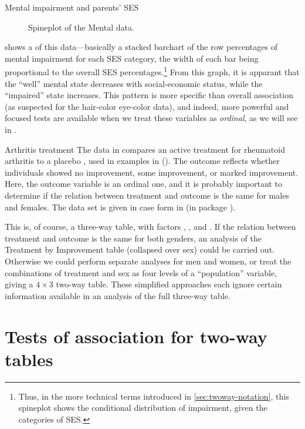 \documentclass[10pt,krantz2]{krantz}\usepackage[]{graphicx}\usepackage[]{color}
\newenvironment{knitrout}{}{} %
\renewenvironment{knitrout}{\small\renewcommand{\baselinestretch}{.85}}{} %
\begin{document}
\begin{Example}[mental1]{Mental impairment and parents' SES}
\begin{knitrout}
\begin{figure}[!htbp]
\caption[Spineplot of the Mental data]{Spineplot of the Mental data.\label{fig:spineplot}}
\end{figure}


\end{knitrout}
 shows a  of this
data---basically a stacked barchart of the row percentages of mental
impairment for each SES category, the width of each bar being proportional to
the overall SES percentages.\footnote{Thus, in the more technical terms introduced in \ref{sec:twoway-notation}, 
this spineplot shows the conditional distribution of impairment, given
the categories of SES.}
From this graph, it is apparant that the ``well'' mental state decreases with
social-economic status, while the ``impaired'' state increases. This
pattern is more specific than overall association (as
suspected for the hair-color eye-color data), and indeed, more powerful and focused tests are available
when we treat these variables as \emph{ordinal}, as we will see in
.
\end{Example}

\begin{Example}[arthrit1]{Arthritis treatment}
The data in  compares an active treatment for rheumatoid
arthritis to a placebo
\citep{KochEdwards:88}, used in examples in 
().
The outcome reflects
whether individuals showed no improvement, some improvement, or
marked improvement.
Here, the outcome variable is an ordinal one, and it is probably
important to determine if the relation between treatment and outcome
is the same for males and females.
The data set is given in case form in  (in package ).


This is, of course, a three-way table, with factors
, , and .
If the relation between treatment and outcome is the same for
both genders, an analysis of the Treatment by Improvement
table (collapsed over sex) could be carried out.
Otherwise we could perform separate analyses for
men and women, or
treat the combinations of treatment and sex as four levels of
a ``population'' variable, giving a $4 \times 3$ two-way table.
These simplified approaches each ignore certain information
available in
an analysis of the full three-way table.
\end{Example}

\section{Tests of association for two-way tables}\label{sec:twoway-tests}
\end{document}
